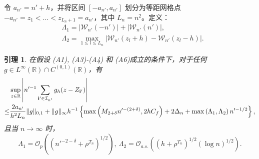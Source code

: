 \documentclass[a4paper,openay,14pt]{ctexbook}
\newtheorem{lem}{引理}
\numberwithin{equation}{section}
\numberwithin{lem}{section}
\begin{document}
令 $a_{n'} = n'+h$，并将区间 $[-a_{n'}, a_{n'}] $ 划分为等距网格点 $-a_{n'} = z_1 < \dots < z_{L_n+1} = a_{n'}$，其中 $L_n = n^2$。定义：
\begin{align}\label{EQ:Lamda1}
    &\Lambda_1 = \left\vert \mathcal{W}_{n'}(-n')\right\vert+ \left\vert \mathcal{W}_{n'}(n')\right\vert, \\ 
    &\Lambda_2 = \max_{1\leq l\leq L_n}\left\vert \mathcal{W}_{n'}(z_l + h) - \mathcal{W}_{n'}(z_l-h)\right\vert. \label{EQ:Lamda2}
\end{align}
\begin{lem}\label{Lemma:g_h}
    在假设 (A1), (A3)-(A4) 和 (A6)成立的条件下，对于任何 $g\in L^{\infty}(\mathbb{R})\cap C^{(0,1)}(\mathbb{R})$，有
    \begin{align}\label{EQ:g_h}
        &\sup_{z\in\mathbb{R}}\left\vert n'^{-1}\sum_{\mathbf{i}'\in\mathcal{I}_{n'}}g_h(z-Z_{\mathbf{i}'})\right\vert \notag\\
        \leq& \frac{2a_{n'}}{h^2L_{n}}\Vert g\Vert_{0,1} + \Vert g\Vert_{\infty}h^{-1}\left\{\max \left( M_{2+\delta}n'^{-(2+\delta)},2hC_f \right ) + 2\Delta_n + \max\left({\Lambda_1},{\Lambda_2}\right) n'^{-1/2}\right\},
    \end{align}
    且当 $n\to\infty$ 时，
    $$ \Lambda_1 = \mathcal{O}_{p}\left(\left(n'^{-2-\delta}+\rho^{T_n}\right)^{1/2}\right),~ \Lambda_2 = \mathcal{O}_{a.s.}\left(\left(h+\rho^{T_n}\right)^{1/2}\left(\log n\right)^{1/2}\right).$$
\end{lem}
\end{document}
